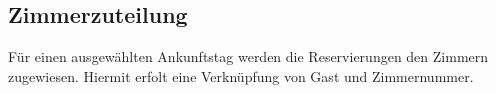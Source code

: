 \documentclass[../SubfileFeatures.tex]{subfiles}
\begin{document}
    \subsection{Zimmerzuteilung}
    Für einen ausgewählten Ankunftstag werden die Reservierungen den Zimmern zugewiesen.
	Hiermit erfolt eine Verknüpfung von Gast und Zimmernummer.
	
\end{document}
